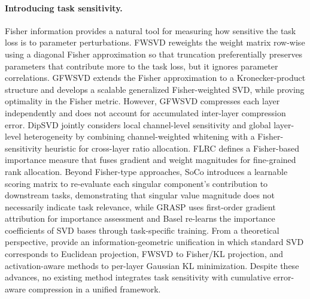 \documentclass[a4paper,fleqn]{cas-dc}
\begin{document}
\paragraph{Introducing task sensitivity.}
Fisher information provides a natural tool for measuring how sensitive the task loss is to parameter perturbations. FWSVD \citep{hsu2022fwsvd} reweights the weight matrix row-wise using a diagonal Fisher approximation so that truncation preferentially preserves parameters that contribute more to the task loss, but it ignores parameter correlations. GFWSVD \citep{chekalina2025gfwsvd} extends the Fisher approximation to a Kronecker-product structure and develops a scalable generalized Fisher-weighted SVD, while proving optimality in the Fisher metric. However, GFWSVD compresses each layer independently and does not account for accumulated inter-layer compression error. DipSVD \citep{ding2025dipsvd} jointly considers local channel-level sensitivity and global layer-level heterogeneity by combining channel-weighted whitening with a Fisher-sensitivity heuristic for cross-layer ratio allocation. FLRC \citep{lu2025flrc} defines a Fisher-based importance measure that fuses gradient and weight magnitudes for fine-grained rank allocation. Beyond Fisher-type approaches, SoCo \citep{li2025soco} introduces a learnable scoring matrix to re-evaluate each singular component's contribution to downstream tasks, demonstrating that singular value magnitude does not necessarily indicate task relevance, while GRASP \citep{liu2025grasp} uses first-order gradient attribution for importance assessment and Basel \citep{li2025basel} re-learns the importance coefficients of SVD bases through task-specific training. From a theoretical perspective, \citet{shumaylov2025infogeo} provide an information-geometric unification in which standard SVD corresponds to Euclidean projection, FWSVD to Fisher/KL projection, and activation-aware methods to per-layer Gaussian KL minimization. Despite these advances, no existing method integrates task sensitivity with cumulative error-aware compression in a unified framework.
\end{document}
